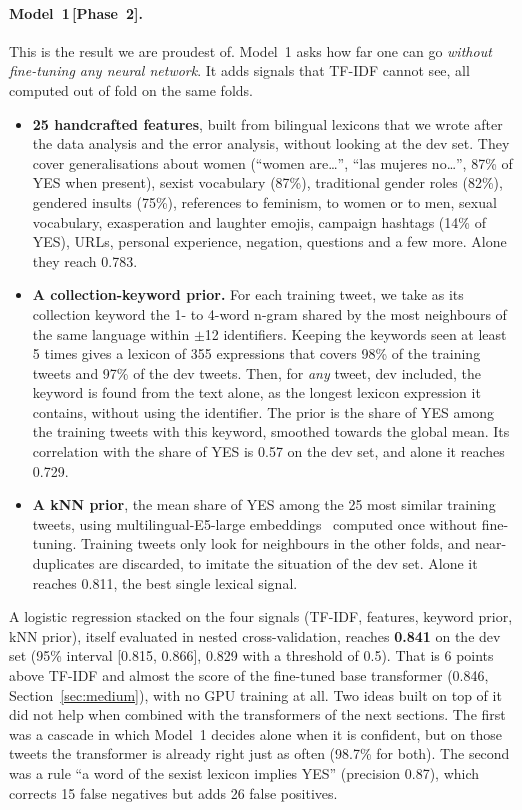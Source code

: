\documentclass[pdflatex,sn-mathphys-num]{sn-jnl}
\newcommand{\Ptwo}{\,{\normalfont\textsf{\small[Phase~2]}}}
\begin{document}
\paragraph{Model~1\Ptwo.} This is the result we are proudest of. Model~1 asks how far one can go \emph{without fine-tuning any neural network}. It adds signals that TF-IDF cannot see, all computed out of fold on the same folds.
\begin{itemize}
\item \textbf{25 handcrafted features}, built from bilingual lexicons that we wrote after the data analysis and the error analysis, without looking at the dev set. They cover generalisations about women (``women are\dots'', ``las mujeres no\dots'', 87\% of YES when present), sexist vocabulary (87\%), traditional gender roles (82\%), gendered insults (75\%), references to feminism, to women or to men, sexual vocabulary, exasperation and laughter emojis, campaign hashtags (14\% of YES), URLs, personal experience, negation, questions and a few more. Alone they reach 0.783.
\item \textbf{A collection-keyword prior.} For each training tweet, we take as its collection keyword the 1- to 4-word n-gram shared by the most neighbours of the same language within $\pm$12 identifiers. Keeping the keywords seen at least 5 times gives a lexicon of 355 expressions that covers 98\% of the training tweets and 97\% of the dev tweets. Then, for \emph{any} tweet, dev included, the keyword is found from the text alone, as the longest lexicon expression it contains, without using the identifier. The prior is the share of YES among the training tweets with this keyword, smoothed towards the global mean. Its correlation with the share of YES is 0.57 on the dev set, and alone it reaches 0.729.
\item \textbf{A kNN prior}, the mean share of YES among the 25 most similar training tweets, using multilingual-E5-large embeddings~\cite{wang2024e5} computed once without fine-tuning. Training tweets only look for neighbours in the other folds, and near-duplicates are discarded, to imitate the situation of the dev set. Alone it reaches 0.811, the best single lexical signal.
\end{itemize}
A logistic regression stacked on the four signals (TF-IDF, features, keyword prior, kNN prior), itself evaluated in nested cross-validation, reaches \textbf{0.841} on the dev set (95\% interval [0.815, 0.866], 0.829 with a threshold of 0.5). That is 6 points above TF-IDF and almost the score of the fine-tuned base transformer (0.846, Section~\ref{sec:medium}), with no GPU training at all. Two ideas built on top of it did not help when combined with the transformers of the next sections. The first was a cascade in which Model~1 decides alone when it is confident, but on those tweets the transformer is already right just as often (98.7\% for both). The second was a rule ``a word of the sexist lexicon implies YES'' (precision 0.87), which corrects 15 false negatives but adds 26 false positives.
\end{document}
